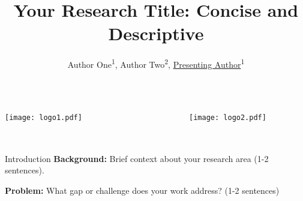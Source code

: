 \documentclass[final,t]{beamer}
\title{Your Research Title: Concise and Descriptive}
\author{Author One\textsuperscript{1}, Author Two\textsuperscript{2}, \underline{Presenting Author}\textsuperscript{1}}
\institute{
  \textsuperscript{1}Department, University Name\\
  \textsuperscript{2}Research Institute Name
}
\begin{document}
\begin{frame}[t]
  
  \begin{block}{}
    \begin{columns}[T]
      \begin{column}{.15\linewidth}
        \texttt{[image: logo1.pdf]}
      \end{column}
      
      \begin{column}{.7\linewidth}
        \centering
        \inserttitle\\[0.5cm]
        \insertauthor\\[0.3cm]
        \insertinstitute
      \end{column}
      
      \begin{column}{.15\linewidth}
        \texttt{[image: logo2.pdf]}
      \end{column}
    \end{columns}
  \end{block}
  
  \vspace{1cm}
  
  
  \begin{columns}[t]
    
    \begin{column}{.3\linewidth}
      
      \begin{block}{Introduction}
        \textbf{Background:} Brief context about your research area (1-2 sentences).
        
        \vspace{0.5cm}
        
        \textbf{Problem:} What gap or challenge does your work address? (1-2 sentences)
        

\end{block}
\end{column}
\end{columns}
\end{frame}
\end{document}
